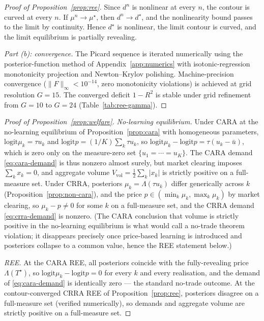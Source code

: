 \documentclass[12pt,letterpaper]{article}
\theoremstyle{definition}
\theoremstyle{remark}
\newcommand{\Lam}{\Lambda}            %
\newcommand{\logit}{\mathrm{logit}}
\newcommand{\Tstar}{T^{\!\star}}
\newcommand{\1}{\mathbf{1}}
\begin{document}
\begin{proof}[Proof of Proposition~\ref{prop:ree}]
Since $d^{n}$ is nonlinear at every $n$, the contour is curved at every
$n$. If $\mu^{n}\to\mu^{\star}$, then $d^{n}\to d^{\star}$, and the
nonlinearity bound passes to the limit by continuity.
Hence $d^{\star}$ is nonlinear, the limit contour is curved, and the
limit equilibrium is partially revealing.

\emph{Part (b): convergence.} The Picard sequence is iterated numerically
using the posterior-function method of
Appendix~\ref{app:numerics} with isotonic-regression monotonicity
projection and Newton--Krylov polishing. Machine-precision convergence
($\|F\|_{\infty}<10^{-14}$, zero monotonicity violations) is achieved
at grid resolution $G=15$. The converged deficit $1-R^{2}$ is stable
under grid refinement from $G=10$ to $G=24$
(Table~\ref{tab:ree-gamma}).
\end{proof}

\begin{proof}[Proof of Proposition~\ref{prop:welfare}]
\emph{No-learning equilibrium.} Under CARA at the no-learning equilibrium
of Proposition~\ref{prop:cara} with homogeneous parameters,
$\logit\mu_{k}=\tau u_{k}$ and $\logit p=(1/K)\sum_{k}\tau u_{k}$, so
$\logit\mu_{k}-\logit p=\tau(u_{k}-\bar u)$, which is zero only on the
measure-zero set $\{u_{1}=\cdots=u_{K}\}$. The CARA demand
\eqref{eq:cara-demand} is thus nonzero almost surely, but market clearing
imposes $\sum_{k}x_{k}=0$, and aggregate volume
$V_{\mathrm{vol}}=\tfrac12\sum_{k}|x_{k}|$ is strictly positive on a
full-measure set. Under CRRA, posteriors $\mu_{k}=\Lam(\tau u_{k})$ differ
generically across $k$ (Proposition~\ref{prop:non-cara}), and the price
$p\in(\min_{k}\mu_{k},\max_{k}\mu_{k})$ by market clearing, so
$\mu_{k}-p\neq 0$ for some $k$ on a full-measure set, and the CRRA demand
\eqref{eq:crra-demand} is nonzero. (The CARA conclusion that volume is
strictly positive in the no-learning equilibrium is what
\citet{Milgrom1982} would call a no-trade theorem violation; it
disappears precisely once price-based learning is introduced and
posteriors collapse to a common value, hence the REE statement below.)

\emph{REE.} At the CARA REE, all posteriors coincide with the
fully-revealing price $\Lam(\Tstar)$, so
$\logit\mu_{k}-\logit p=0$ for every $k$ and every realisation, and the
demand of \eqref{eq:cara-demand} is identically zero --- the standard
\citet{Milgrom1982} no-trade outcome. At the contour-converged CRRA REE
of Proposition~\ref{prop:ree}, posteriors disagree on a full-measure set
(verified numerically), so demands and aggregate volume are strictly
positive on a full-measure set.
\end{proof}
\end{document}
